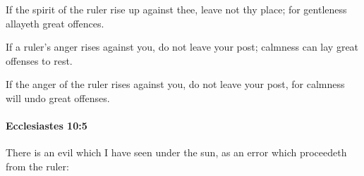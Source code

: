 			\begin{versebox}
					\item[BHS] 
					\item[LXX] 
					\item[ASV] If the spirit of the ruler rise up against thee, leave not thy place; for gentleness allayeth great offences.
					\item[NIV] If a ruler’s anger rises against you, do not leave your post; calmness can lay great offenses to rest.
					\item[NRSV] If the anger of the ruler rises against you, do not leave your post, for calmness will undo great offenses.
			\end{versebox}

		\paragraph{Ecclesiastes 10:5} %
			\label{ECCLESIASTES-10-5}

			There is an evil which I have seen under the sun, as an error which proceedeth from the ruler:

